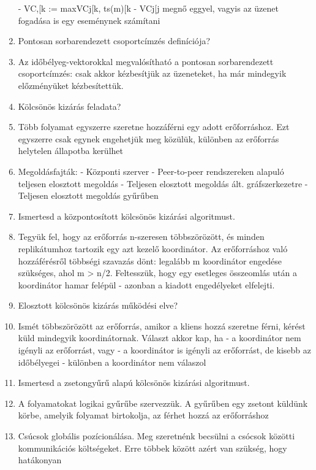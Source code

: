 \documentclass[twoside, a4paper, 12pt]{article}
\begin{document}
\begin{enumerate}
                - VC,[k := max{VCj[k, ts(m)[k}
                - VCj[j megnő eggyel, vagyis az üzenet fogadása is egy eseménynek számítani
            \item  Pontosan sorbarendezett csoportcímzés definíciója?
            \item Az időbélyeg-vektorokkal megvalósítható a pontosan sorbarendezett csoportcímzés: csak akkor kézbesítjük az üzeneteket,
                ha már mindegyik előzményüket kézbesítettük.
            \item  Kölcsönös kizárás feladata?
            \item Több folyamat egyszerre szeretne hozzáférni egy adott erőforráshoz. Ezt egyszerre csak egynek engehetjük meg közülük,
                különben az erőforrás helytelen állapotba kerülhet
            \item Megoldásfajták: 
                - Központi szerver
                - Peer-to-peer rendszereken alapuló teljesen elosztott megoldás
                - Teljesen elosztott megoldás ált. gráfszerkezetre
                - Teljesen elosztott megoldás gyűrűben
            \item  Ismertesd a központosított kölcsönös kizárási algoritmust.
            \item Tegyük fel, hogy az erőforrás n-szeresen többszörözött, és minden replikátumhoz tartozik egy azt kezelő koordinátor.
                Az erőforráshoz való hozzáférésről többségi szavazás dönt: legalább m koordinátor engedése szükséges, ahol m > n/2.
                Feltesszük, hogy egy esetleges összeomlás után a koordinátor hamar felépül - azonban a kiadott engedélyeket elfelejti.
            \item  Elosztott kölcsönös kizárás működési elve?
            \item Ismét többszörözött az erőforrás, amikor a kliens hozzá szeretne férni, kérést küld mindegyik koordinátornak. Választ akkor kap, ha
                - a koordinátor nem igényli az erőforrást, vagy
                - a koordinátor is igényli az erőforrást, de kisebb az időbélyegei
                - különben a koordinátor nem válaszol
            \item  Ismertesd a zsetongyűrű alapú kölcsönös kizárási algoritmust.
            \item A folyamatokat logikai gyűrűbe szervezzük. A gyűrűben egy zsetont küldünk körbe, amelyik folyamat birtokolja,
                az férhet hozzá az erőforráshoz
            \item  Csúcsok globális pozícionálása. Meg szeretnénk becsülni a csócsok közötti kommunikációs költségeket. Erre többek között azért van szükség, hogy hatákonyan

\end{enumerate}
\end{document}
